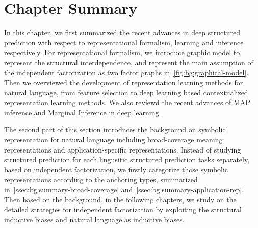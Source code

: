 \section{Chapter Summary}
\label{sec:bg:summary}
In this chapter, we first summarized the recent advances in deep
structured prediction with respect to representational formalism,
learning and inference respectively. For representational formalism,
we introduce graphic model to represent the structural
interdependence, and represent the main assumption of the independent
factorization as two factor graphs
in~\autoref{fig:bg:graphical-model}. Then we overviewed the
development of representation learning methods for natural language,
from feature selection to deep learning based contextualized
representation learning methods. We also reviewd the recent advances
of MAP inference and Marginal Inference in deep learning.

The second part of this section introduces the background on symbolic
representation for natural language including broad-coverage meaning
representations and application-specific representations. Instead of
studying structured prediction for each lingusitic structured
prediction tasks separately, based on independent factorization, we
firstly categorize those symbolic representations according to the
anchoring types, summarized
in~\autoref{ssec:bg:summary-broad-coverage}
and~\autoref{ssec:bg:summary-application-rep}. Then based on the background, in the following
chapters, we study on the detailed strategies for independent factorization by exploiting the structural inductive biases and natural
language as inductive biases.
